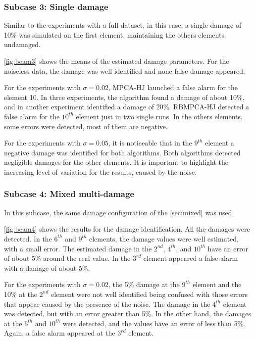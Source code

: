 \subsubsection{Subcase 3: Single damage}

Similar to the experiments with a full dataset, in this case, a single damage of 10\% was simulated on the first element, maintaining the others elements undamaged.

\autoref{fig:beam3} shows the means of the estimated damage parameters. For the noiseless data, the damage was well identified and none false damage appeared.

For the experiments with $\sigma = 0.02$, MPCA-HJ launched a false alarm for the element 10. In three experiments, the algorithm found a damage of about 10\%, and in another experiment identified a damage of 20\%. RBMPCA-HJ detected a false alarm for the $10^{th}$ element just in two single runs. In the others elements, some errors were detected, most of them are negative.

For the experiments with $\sigma = 0.05$, it is noticeable that in the $9^{th}$ element a negative damage was identified for both algorithms. Both algorithms detected negligible damages for the other elements. It is important to highlight the increasing level of variation for the results, caused by the noise.

\subsubsection{Subcase 4: Mixed multi-damage}

In this subcase, the same damage configuration of the \autoref{sec:mixed} was used.

\autoref{fig:beam4} shows the results for the damage identification. All the damages were detected. In the $6^{th}$ and $9^{th}$ elements, the damage values were well estimated, with a small error. The estimated damage in the $2^{nd}$, $4^{th}$, and $10^{th}$ have an error of about 5\% around the real value. In the $3^{rd}$ element appeared a false alarm with a damage of about 5\%.

For the experiments with $\sigma = 0.02$, the 5\% damage at the $9^{th}$ element and the 10\% at the $2^{nd}$ element were not well identified being confused with those errors that appear caused by the presence of the noise. The damage in the $4^{th}$ element was detected, but with an error greater than 5\%. In the other hand, the damages at the $6^{th}$ and $10^{th}$ were detected, and the values have an error of less than 5\%. Again, a false alarm appeared at the $3^{rd}$ element.


